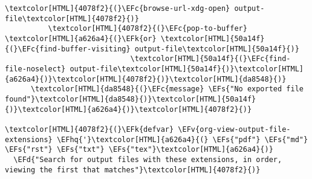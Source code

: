 \documentclass{scrartcl}
\newcommand{\EFk}[1]{\textcolor{EFk}{#1}} %
\newcommand{\EFd}[1]{\textcolor{EFd}{\textit{#1}}} %
\newcommand{\EFs}[1]{\textcolor{EFs}{#1}} %
\newcommand{\EFc}[1]{\textcolor{EFc}{#1}} %
\newcommand{\EFv}[1]{\textcolor{EFv}{#1}} %
\newcommand{\EFhq}[1]{\textcolor{EFhq}{#1}} %
\begin{document}
\begin{Code}
\begin{Verbatim}[]
            \textcolor[HTML]{4078f2}{(}\EFc{browse-url-xdg-open} output-file\textcolor[HTML]{4078f2}{)}
          \textcolor[HTML]{4078f2}{(}\EFc{pop-to-buffer} \textcolor[HTML]{a626a4}{(}\EFk{or} \textcolor[HTML]{50a14f}{(}\EFc{find-buffer-visiting} output-file\textcolor[HTML]{50a14f}{)}
                             \textcolor[HTML]{50a14f}{(}\EFc{find-file-noselect} output-file\textcolor[HTML]{50a14f}{)}\textcolor[HTML]{a626a4}{)}\textcolor[HTML]{4078f2}{)}\textcolor[HTML]{da8548}{)}
      \textcolor[HTML]{da8548}{(}\EFc{message} \EFs{"No exported file found"}\textcolor[HTML]{da8548}{)}\textcolor[HTML]{50a14f}{)}\textcolor[HTML]{a626a4}{)}\textcolor[HTML]{4078f2}{)}

\textcolor[HTML]{4078f2}{(}\EFk{defvar} \EFv{org-view-output-file-extensions} \EFhq{'}\textcolor[HTML]{a626a4}{(} \EFs{"pdf"} \EFs{"md"} \EFs{"rst"} \EFs{"txt"} \EFs{"tex"}\textcolor[HTML]{a626a4}{)}
  \EFd{"Search for output files with these extensions, in order, viewing the first that matches"}\textcolor[HTML]{4078f2}{)}
\end{Verbatim}
\end{Code}
\end{document}
